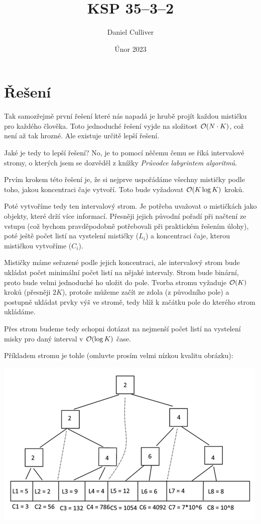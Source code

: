 \documentclass{../../../ksp}
\title{KSP 35--3--2}
\author{Daniel Culliver}
\date{Únor 2023}
\begin{document}
\maketitle

\section*{Řešení}

Tak samozřejmě první řešení které nás napadá je hrubě projít každou mističku pro každého člověka.
Toto jednoduché řešení vyjde na složitost $\mathcal{O}(N \cdot K)$, což není až tak hrozné.
Ale existuje určitě lepší řešení.

Jaké je tedy to lepší řešení?
No, je to pomocí něčemu čemu se říká intervalové stromy, o kterých jsem se dozvěděl z knížky \emph{Průvodce labyrintem algoritmů}.

Prvím krokem této řešení je, že si nejprve uspořádáme všechny mističky podle toho, jakou koncentraci čaje vytvoří.
Toto bude vyžadovat $\mathcal{O}(K\log{K})$ kroků.

Poté vytvoříme tedy ten intervalový strom. Je potřeba uvažovat o mističkách jako objekty, které drží více informací.
Přesněji jejich původní pořadí při načtení ze vstupu (což bychom pravděpodobně potřebovali při praktickém řešením úlohy),
poté ještě počet listí na vystelení mističky ($L_i$) a koncentraci čaje, kterou mističkou vytvoříme ($C_i$).

Mističky máme seřazené podle jejich koncentraci, ale intervalový strom bude ukládat počet minimální počet listí na nějaké intervaly.
Strom bude binární, proto bude velmi jednoduché ho uložit do pole.
Tvorba stromu vyžaduje $\mathcal{O}(K)$ kroků (přesněji $2K$), protože můžeme začít ze zdola (z původního pole) a postupně ukládat prvky výš ve stromě,
tedy blíž k začátku pole do kterého strom ukládáme.

Přes strom budeme tedy schopni dotázat na nejmenší počet listí na vystelení misky pro daný interval v $\mathcal{O}(\log{K})$ čase.

Příkladem stromu je tohle (omluvte prosím velmi nízkou kvalitu obrázku):

\includegraphics{strom2}
\end{document}
